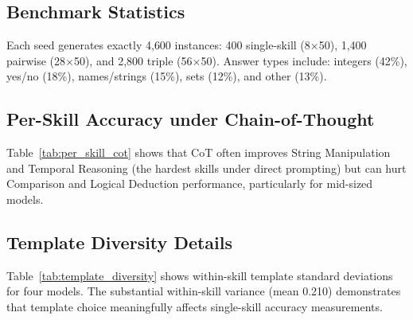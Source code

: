 \documentclass{article}
\begin{document}
\subsection{Benchmark Statistics}
Each seed generates exactly 4{,}600 instances: 400 single-skill (8$\times$50), 1{,}400 pairwise (28$\times$50), and 2{,}800 triple (56$\times$50). Answer types include: integers (42\%), yes/no (18\%), names/strings (15\%), sets (12\%), and other (13\%).

\subsection{Per-Skill Accuracy under Chain-of-Thought}

\begin{table}[h]
\centering
\caption{Single-skill accuracy (\%) under CoT prompting.}
\label{tab:per_skill_cot}
\end{table}

Table~\ref{tab:per_skill_cot} shows that CoT often improves String Manipulation and Temporal Reasoning (the hardest skills under direct prompting) but can hurt Comparison and Logical Deduction performance, particularly for mid-sized models.

\subsection{Template Diversity Details}

Table~\ref{tab:template_diversity} shows within-skill template standard deviations for four models. The substantial within-skill variance (mean 0.210) demonstrates that template choice meaningfully affects single-skill accuracy measurements.
\end{document}
